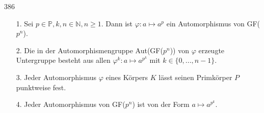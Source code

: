 \begin{algebraUE}{386}

  \begin{itemize}
      \item[1.] Sei $p \in \mathbb{P}, k, n \in \mathbb{N}, n \geq 1.$ Dann ist $\varphi: a \mapsto a^p$ ein Automorphismus von GF($p^n$).
      \item[2.] Die in der Automorphismengruppe Aut(GF($p^n$)) von $\varphi$ erzeugte Untergruppe besteht aus allen $\varphi^k: a \mapsto a^{p^k}$ mit $k \in \{0, ..., n-1\}.$
      \item[3.] Jeder Automorphismus $\varphi$ eines Körpers $K$ lässt seinen Primkörper $P$ punktweise fest.
      \item[4.] Jeder Automorphismus von GF($p^n$) ist von der Form $a \mapsto a^{p^k}.$
  \end{itemize}
\end{algebraUE}

